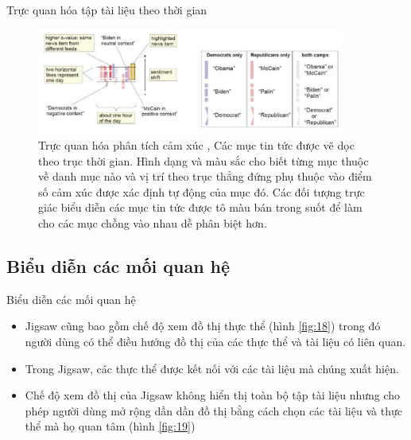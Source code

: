 \documentclass[10pt]{beamer}
\theoremstyle{remark}
\theoremstyle{definition}
\begin{document}
\begin{frame}{Trực quan hóa tập tài liệu theo thời gian}
	\begin{figure}[h!]
        \centering
        \includegraphics[width=0.9\textwidth]{17.png}
        \caption{Trực quan hóa phân tích cảm xúc \cite{440},
        Các mục tin tức được vẽ dọc theo trục thời gian.
        Hình dạng và màu sắc cho biết từng mục thuộc về danh mục nào và vị trí theo trục thẳng đứng phụ thuộc vào điểm số cảm xúc được xác định tự động của mục đó.
        Các đối tượng trực giác biểu diễn các mục tin tức được tô màu bán trong suốt để làm cho các mục chồng vào nhau dễ phân biệt hơn.}
        \label{fig:17}
    \end{figure}
\end{frame}

\subsection{Biểu diễn các mối quan hệ}

\begin{frame}{Biểu diễn các mối quan hệ}
	\begin{itemize}
		\item Jigsaw \cite{155} cũng bao gồm chế độ xem đồ thị thực thể (hình \ref{fig:18}) trong đó người dùng có thể điều hướng đồ thị của các thực thể và tài liệu có liên quan.
		\item Trong Jigsaw, các thực thể được kết nối với các tài liệu mà chúng xuất hiện.
		\item Chế độ xem đồ thị của Jigsaw không hiển thị toàn bộ tập tài liệu nhưng cho phép người dùng mở rộng dần dần đồ thị bằng cách chọn các tài liệu và thực thể mà họ quan tâm (hình \ref{fig:19})
	\end{itemize}
\end{frame}
\end{document}
